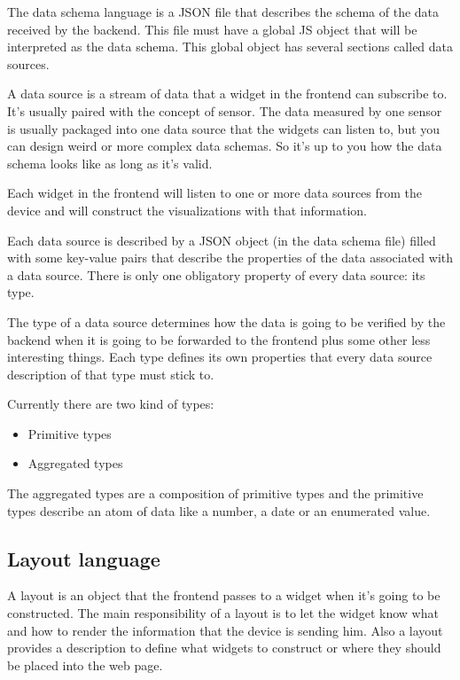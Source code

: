 \documentclass[12pt]{article}
\begin{document}
            The data schema language is a JSON file that describes the schema of
            the data received by the backend.  This file must have a global JS
            object that will be interpreted as the data schema. This global
            object has several sections called data sources.

            A data source is a stream of data that a widget in the frontend can
            subscribe to.  It's usually paired with the concept of sensor.
            The data measured by one sensor is usually packaged into one data
            source that the widgets can listen to, but you can design weird or
            more complex data schemas. So it's up to you how the data schema
            looks like as long as it's valid.

            Each widget in the frontend will listen to one or more data sources
            from the device and will construct the visualizations with that
            information.

            Each data source is described by a JSON object (in the data schema
            file) filled with some key-value pairs that describe the properties
            of the data associated with a data source. There is only one
            obligatory property of every data source: its type.

            The type of a data source determines how the data is going to be
            verified by the backend when it is going to be forwarded to the
            frontend plus some other less interesting things. Each type defines
            its own properties that every data source description of that type
            must stick to.

            Currently there are two kind of types:

            \begin{itemize}
                \item Primitive types
                \item Aggregated types
            \end{itemize}

            The aggregated types are a composition of primitive types and the
            primitive types describe an atom of data like a number, a date or an
            enumerated value.

        \subsection{Layout language}
            A layout is an object that the frontend passes to a widget when it's
            going to be constructed. The main responsibility of a layout is to
            let the widget know what and how to render the information that the
            device is sending him. Also a layout provides a description to
            define what widgets to construct or where they should be placed into
            the web page.
\end{document}

